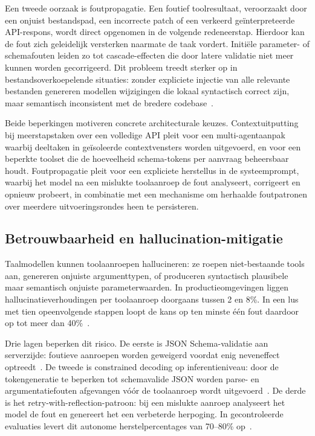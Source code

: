Een tweede oorzaak is foutpropagatie. Een foutief toolresultaat, veroorzaakt door een onjuist bestandspad, een incorrecte patch of een verkeerd geïnterpreteerde API-respons, wordt direct opgenomen in de volgende redeneerstap. Hierdoor kan de fout zich geleidelijk versterken naarmate de taak vordert. Initiële parameter- of schemafouten leiden zo tot cascade-effecten die door latere validatie niet meer kunnen worden gecorrigeerd. Dit probleem treedt sterker op in bestandsoverkoepelende situaties: zonder expliciete injectie van alle relevante bestanden genereren modellen wijzigingen die lokaal syntactisch correct zijn, maar semantisch inconsistent met de bredere codebase~\cite{Luo2025MCPUniverse}.

Beide beperkingen motiveren concrete architecturale keuzes. Contextuitputting bij meerstapstaken over een volledige API pleit voor een multi-agentaanpak waarbij deeltaken in geïsoleerde contextvensters worden uitgevoerd, en voor een beperkte toolset die de hoeveelheid schema-tokens per aanvraag beheersbaar houdt. Foutpropagatie pleit voor een expliciete herstellus in de systeemprompt, waarbij het model na een mislukte toolaanroep de fout analyseert, corrigeert en opnieuw probeert, in combinatie met een mechanisme om herhaalde foutpatronen over meerdere uitvoeringsrondes heen te persisteren.

\subsection{Betrouwbaarheid en hallucination-mitigatie}\label{subsec:reliability}

Taalmodellen kunnen toolaanroepen hallucineren: ze roepen niet-bestaande tools aan, genereren onjuiste argumenttypen, of produceren syntactisch plausibele maar semantisch onjuiste parameterwaarden. In productieomgevingen liggen hallucinatieverhoudingen per toolaanroep doorgaans tussen 2 en 8\%. In een lus met tien opeenvolgende stappen loopt de kans op ten minste één fout daardoor op tot meer dan 40\%~\cite{Hasan2025MCPFirstGlance}.

Drie lagen beperken dit risico. De eerste is JSON Schema-validatie aan serverzijde: foutieve aanroepen worden geweigerd voordat enig neveneffect optreedt~\cite{Hasan2025MCPFirstGlance}. De tweede is constrained decoding op inferentieniveau: door de tokengeneratie te beperken tot schemavalide JSON worden parse- en argumentatiefouten afgevangen vóór de toolaanroep wordt uitgevoerd~\cite{Ray_2025}. De derde is het retry-with-reflection-patroon: bij een mislukte aanroep analyseert het model de fout en genereert het een verbeterde herpoging. In gecontroleerde evaluaties levert dit autonome herstelpercentages van 70–80\% op~\cite{Hasan2025MCPFirstGlance}.


